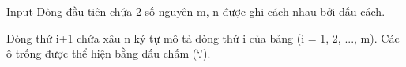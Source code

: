 Input
Dòng đầu tiên chứa 2 số nguyên m, n được ghi cách nhau bởi dấu cách.

Dòng thứ i+1 chứa xâu n ký tự mô tả dòng thứ i của bảng (i = 1, 2, ..., m). Các ô trống được thể hiện bằng dấu chấm (‘.’).